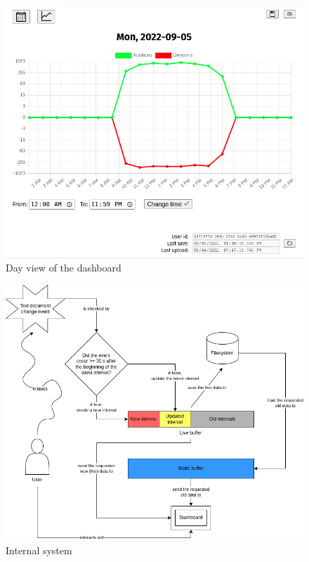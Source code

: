 \begin{figure}[htbp]
  \centering
  \includegraphics[scale=0.5]{chapters/day-view.png}
  \caption{Day view of the dashboard}
\end{figure}

\begin{figure}[htbp]
  \centering
  \includegraphics[scale=0.5]{chapters/internal_system.png}
  \caption{Internal system}
\end{figure}

